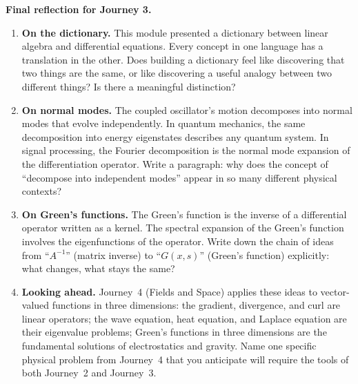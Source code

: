 \documentclass[12pt,a4paper]{article}
\newcounter{problem}
\begin{document}
\begin{reflectionbox}
\textbf{Final reflection for Journey 3.}

\begin{enumerate}
  \item \textbf{On the dictionary.} This module presented a dictionary between linear algebra and differential equations. Every concept in one language has a translation in the other. Does building a dictionary feel like discovering that two things are the same, or like discovering a useful analogy between two different things? Is there a meaningful distinction?

  \item \textbf{On normal modes.} The coupled oscillator's motion decomposes into normal modes that evolve independently. In quantum mechanics, the same decomposition into energy eigenstates describes any quantum system. In signal processing, the Fourier decomposition is the normal mode expansion of the differentiation operator. Write a paragraph: why does the concept of ``decompose into independent modes'' appear in so many different physical contexts?

  \item \textbf{On Green's functions.} The Green's function is the inverse of a differential operator written as a kernel. The spectral expansion of the Green's function involves the eigenfunctions of the operator. Write down the chain of ideas from ``$A^{-1}$'' (matrix inverse) to ``$G(x,s)$'' (Green's function) explicitly: what changes, what stays the same?

  \item \textbf{Looking ahead.} Journey~4 (Fields and Space) applies these ideas to vector-valued functions in three dimensions: the gradient, divergence, and curl are linear operators; the wave equation, heat equation, and Laplace equation are their eigenvalue problems; Green's functions in three dimensions are the fundamental solutions of electrostatics and gravity. Name one specific physical problem from Journey~4 that you anticipate will require the tools of both Journey~2 and Journey~3.
\end{enumerate}
\end{reflectionbox}
\end{document}
